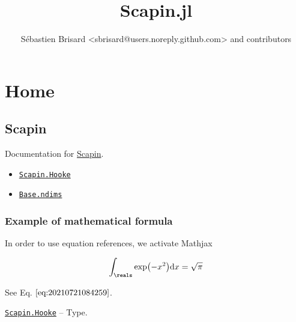\documentclass[oneside]{memoir}
\title{
    {\HUGE Scapin.jl}\\
    {\Large }
}
\author{Sébastien Brisard <sbrisard@users.noreply.github.com> and contributors}
\begin{document}
\frontmatter
\maketitle
\clearpage
\tableofcontents

\mainmatter



\part{Home}




\hypertarget{4654847035117066990}{}


\chapter{Scapin}



Documentation for \href{https://github.com/sbrisard/Scapin.jl}{Scapin}.


\begin{itemize}
\item \hyperlink{8158906180689097333}{\texttt{Scapin.Hooke}}
\item \hyperlink{9897744485205590030}{\texttt{Base.ndims}}
\end{itemize}


\hypertarget{1429156231286803221}{}


\section{Example of mathematical formula}



In order to use equation references, we activate Mathjax



\begin{equation*}
\begin{split}\begin{equation}
\label{eq:20210721084259}
\int_\reals\exp\bigl(-x^2\bigr)\mathrm{d} x=\sqrt{\pi}
\end{equation}\end{split}\end{equation*}


See Eq. \(\eqref{eq:20210721084259}\).


\hypertarget{8158906180689097333}{} 
\hyperlink{8158906180689097333}{\texttt{Scapin.Hooke}}  -- {Type.}
\end{document}
